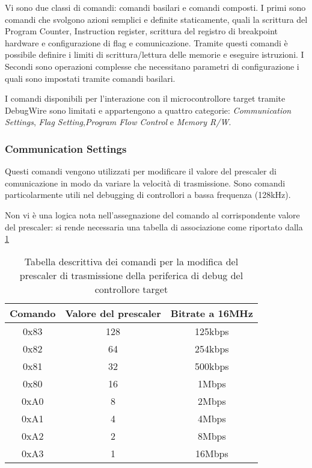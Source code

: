 Vi sono due classi di comandi: comandi basilari e comandi composti.
I primi sono comandi che svolgono azioni semplici e definite staticamente, quali la scrittura del Program Counter, Instruction register, scrittura del registro di breakpoint hardware e configurazione di flag e comunicazione. Tramite questi comandi è possibile definire i limiti di scrittura/lettura delle memorie e eseguire istruzioni.
I Secondi sono operazioni complesse che necessitano parametri di configurazione i quali sono impostati tramite comandi basilari.

I comandi disponibili per l'interazione con il microcontrollore target tramite DebugWire sono limitati e appartengono a quattro categorie: \textit{Communication Settings}, \textit{Flag Setting},\textit{Program Flow Control} e \textit{Memory R/W}.

\subsubsection{Communication Settings}

Questi comandi vengono utilizzati per modificare il valore del prescaler di comunicazione in modo da variare la velocità di trasmissione. Sono comandi particolarmente utili nel debugging di controllori a bassa frequenza (128kHz).

Non vi è una logica nota nell'assegnazione del comando al corrispondente valore del prescaler: si rende necessaria una tabella di associazione come riportato dalla \cref{tab:dw-presc-settings}

\begin{table}[ht]
    \centering
    \begin{tabular}{ c c c }
        \textbf{Comando} & \textbf{Valore del prescaler} & \textbf{Bitrate a 16MHz} \\
        \hline
        0x83 & 128 & 125kbps \\
        0x82 & 64 & 254kbps \\
        0x81 & 32 & 500kbps \\
        0x80 & 16 & 1Mbps \\
        0xA0 & 8 & 2Mbps \\
        0xA1 & 4 & 4Mbps \\
        0xA2 & 2 & 8Mbps \\
        0xA3 & 1 & 16Mbps \\
        \hline
    \end{tabular}
    \caption[]{Tabella descrittiva dei comandi per la modifica del prescaler di trasmissione della periferica di debug del controllore target\cite{site:dw-reverse-engeneering}}\label{tab:dw-presc-settings}
\end{table}

